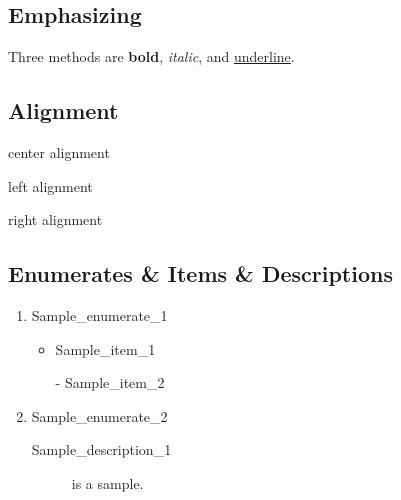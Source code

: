 \documentclass[12pt, oneside]{article}
\begin{document}
\subsection{Emphasizing}
Three methods are \textbf{bold}, \emph{italic}, and \underline{underline}.



\subsection{Alignment}
\begin{center}
center alignment
\end{center}
\begin{flushleft}
left alignment
\end{flushleft}
\begin{flushright}
right alignment
\end{flushright}



\subsection{Enumerates \& Items \& Descriptions}

\begin{enumerate}
\item Sample\_enumerate\_1

\begin{itemize}
\item Sample\_item\_1
\item[-] Sample\_item\_2
\end{itemize}
\item Sample\_enumerate\_2

\begin{description}
\item [Sample\_description\_1] is a sample. %
\end{description}
\end{enumerate}
\end{document}

